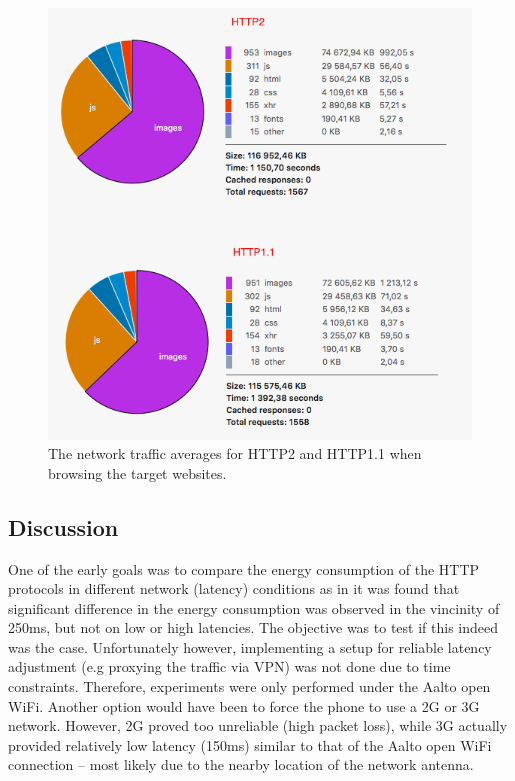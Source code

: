 \documentclass{article}
\begin{document}
\begin{figure}[h!]
\centering
\includegraphics[scale=0.6]{images/http2_consumes.png}
\caption{The network traffic averages for HTTP2 and HTTP1.1 when browsing the target websites.}
\label{fig:http2_network_traffic}
\end{figure}

\clearpage

\subsection{Discussion}
\label{chapter:discussion}

One of the early goals was to compare the energy consumption of the HTTP protocols in different network (latency) conditions as in \cite{previous_work} it was found that significant difference in the energy consumption was observed in the vincinity of 250ms, but not on low or high latencies. The objective was to test if this indeed was the case. Unfortunately however, implementing a setup for reliable latency adjustment (e.g proxying the traffic via VPN) was not done due to time constraints. Therefore, experiments were only performed under the Aalto open WiFi. Another option would have been to force the phone to use a 2G or 3G network. However, 2G proved too unreliable (high packet loss), while 3G actually provided relatively low latency (150ms) similar to that of the Aalto open WiFi connection -- most likely due to the nearby location of the network antenna.
\end{document}
